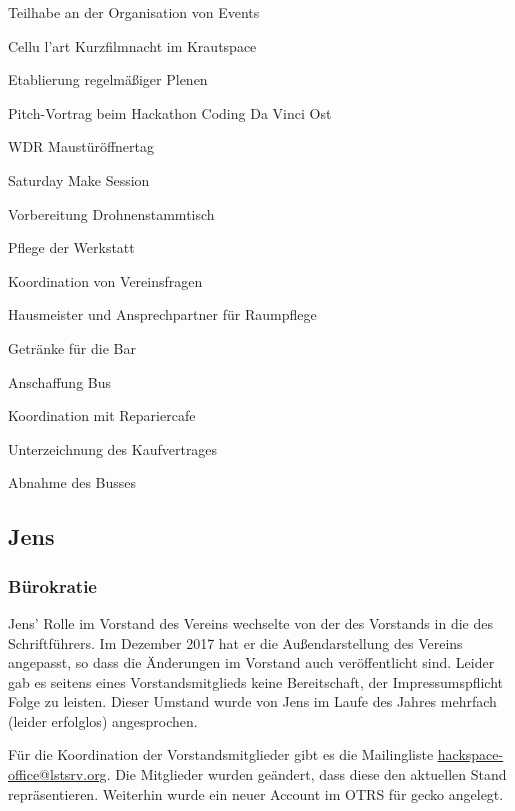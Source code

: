 \documentclass[ngerman]{scrartcl}
\begin{document}
\begin{compactitem}
\begin{compactitem}
    \end{compactitem}
    \item Teilhabe an der Organisation von Events
    \begin{compactitem}
        \item Cellu l'art Kurzfilmnacht im Krautspace
        \item Etablierung regelmäßiger Plenen
        \item Pitch-Vortrag beim Hackathon Coding Da Vinci Ost
        \item WDR Maustüröffnertag
        \item Saturday Make Session
        \item Vorbereitung Drohnenstammtisch
    \end{compactitem}
    \item Pflege der Werkstatt
    \item Koordination von Vereinsfragen
    \item Hausmeister und Ansprechpartner für Raumpflege
    \item Getränke für die Bar
    \item Anschaffung Bus 
    \begin{compactitem}
        \item Koordination mit Repariercafe
        \item Unterzeichnung des Kaufvertrages
        \item Abnahme des Busses
    \end{compactitem}
\end{compactitem}

\subsection{Jens}

\subsubsection{Bürokratie}


Jens' Rolle im Vorstand des Vereins wechselte von der des Vorstands in die des
Schriftführers. Im Dezember 2017 hat er die Außendarstellung des Vereins
angepasst, so dass die Änderungen im Vorstand auch veröffentlicht sind. Leider
gab es seitens eines Vorstandsmitglieds keine Bereitschaft, der
Impressumspflicht Folge zu leisten. Dieser Umstand wurde von Jens im Laufe des
Jahres mehrfach (leider erfolglos) angesprochen.

Für die Koordination der Vorstandsmitglieder gibt es die Mailingliste
\href{https://lstsrv.org/mailman/listinfo/hackspace-office}{hackspace-office@lstsrv.org}. Die
Mitglieder wurden geändert, dass diese den aktuellen Stand
repräsentieren. Weiterhin wurde ein neuer Account im OTRS für gecko angelegt.
\end{document}
